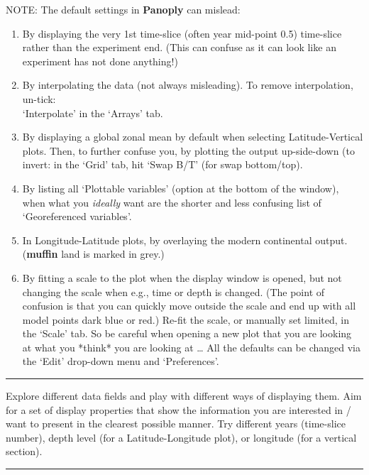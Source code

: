 \documentclass[11pt,fleqn]{book} %
\begin{document}
NOTE: The default settings in \textbf{Panoply} can mislead:
\begin{enumerate}
\item By displaying the very 1st time-slice (often year mid-point 0.5) time-slice rather than the experiment end. (This can confuse as it can look like an experiment has not done anything!)
\item By interpolating the data (not always misleading). To remove interpolation, un-tick:
\\‘\textsf{Interpolate}’ in the ‘\textsf{Arrays}’ tab.
\item By displaying a global zonal mean by default when selecting \textsf{Latitude-Vertical} plots. Then, to further confuse you, by plotting the output up-side-down (to invert: in the ‘\textsf{Grid}’ tab, hit ‘\textsf{Swap B/T}’ (for swap bottom/top).
\item By listing all ‘\textsf{Plottable variables}’ (option at the bottom of the window), when what you \textit{ideally} want are  the shorter and less confusing list of ‘\textsf{Georeferenced variables}’.
\item In \textsf{Longitude-Latitude} plots, by overlaying the modern continental output. (\textbf{muffin} land is marked in grey.)
\item By fitting a scale to the plot when the display window is opened, but not changing the scale when e.g., time or depth is changed. (The point of confusion is that you can quickly move outside the scale and end up with all model points dark blue or red.) Re-fit the scale, or manually set limited, in the ‘\textsf{Scale}’ tab.
So be careful when opening a new plot that you are looking at what you *think* you are looking at …
All the defaults can be changed via the ‘\textsf{Edit}’ drop-down menu and ‘\textsf{Preferences}’.
\end{enumerate}

\vspace{1mm}
\noindent\rule{4cm}{0.1mm}
\vspace{2mm}

\noindent Explore different data fields and play with different ways of displaying them. Aim for a set of display properties that show the information you are interested in / want to present in the clearest possible manner. Try different years (time-slice number), depth level (for a Latitude-Longitude plot), or longitude (for a vertical section).

\vspace{1mm}
\noindent\rule{4cm}{0.1mm}
\vspace{2mm}
\end{document}
